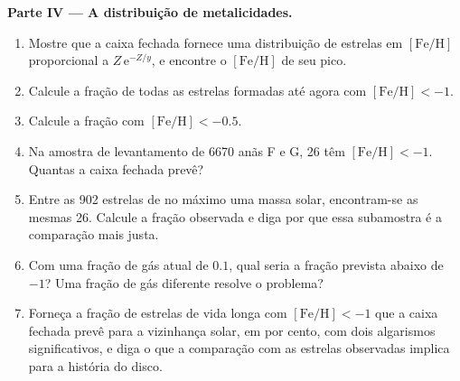 \begin{problem}
\medskip\noindent\textbf{Parte IV --- A distribuição de metalicidades.}
\begin{enumerate}[resume]
\item Mostre que a caixa fechada fornece uma distribuição de estrelas em
  $[\mathrm{Fe/H}]$ proporcional a $Z\,\mathrm{e}^{-Z/y}$, e encontre o
  $[\mathrm{Fe/H}]$ de seu pico.
\item Calcule a fração de todas as estrelas formadas até agora com
  $[\mathrm{Fe/H}] < -1$.
\item Calcule a fração com $[\mathrm{Fe/H}] < -0.5$.
\item Na amostra de levantamento de 6670 anãs F e G, 26 têm
  $[\mathrm{Fe/H}] < -1$. Quantas a caixa fechada prevê?
\item Entre as 902 estrelas de no máximo uma massa solar, encontram-se as
  mesmas 26. Calcule a fração observada e diga por que essa subamostra é
  a comparação mais justa.
\item Com uma fração de gás atual de $0.1$, qual seria a fração prevista
  abaixo de $-1$? Uma fração de gás diferente resolve o
  problema?
\item Forneça a fração de estrelas de vida longa com $[\mathrm{Fe/H}] < -1$
  que a caixa fechada prevê para a vizinhança solar, em por cento,
  com dois algarismos significativos, e diga o que a comparação com as
  estrelas observadas implica para a história do disco.
\end{enumerate}
\end{problem}
